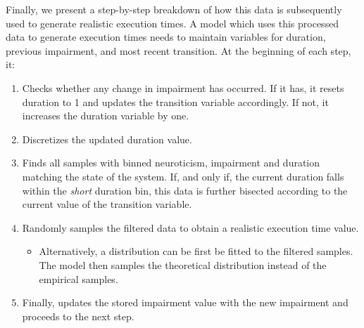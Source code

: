 Finally, we present a step-by-step breakdown of how this data is subsequently used to generate realistic execution times.
A model which uses this processed data to generate execution times needs to maintain variables for duration, previous impairment, and most recent transition.
At the beginning of each step, it:
\begin{enumerate}
    \item Checks whether any change in impairment has occurred.
          If it has, it resets duration to \num{1} and updates the transition variable accordingly.
          If not, it increases the duration variable by one.
    \item Discretizes the updated duration value.
    \item Finds all samples with binned neuroticism, impairment and duration matching the state of the system.
    If, and only if, the current duration falls within the \emph{short} duration bin, this data is further bisected according to the current value of the transition variable.
    \item Randomly samples the filtered data to obtain a realistic execution time value.
          \begin{itemize}
              \item Alternatively, a distribution can be first be fitted to the filtered samples.
                    The model then samples the theoretical distribution instead of the empirical samples.
          \end{itemize}
    \item Finally, updates the stored impairment value with the new impairment and proceeds to the next step.
\end{enumerate}



